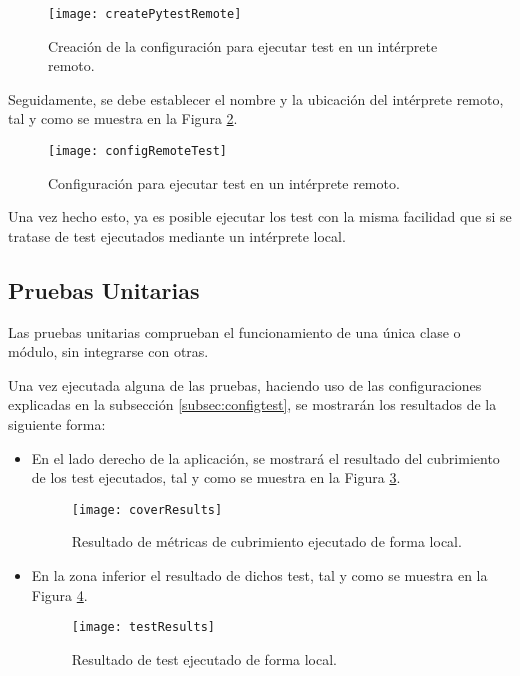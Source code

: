 \begin{figure}[H]
	\centering
	\texttt{[image: createPytestRemote]}
	\caption[Creación de configuración de test de ejecución remota]{Creación de la configuración para ejecutar test en un intérprete remoto.}\label{fig:createPytestRemote}
\end{figure}

Seguidamente, se debe establecer el nombre y la ubicación del intérprete remoto, tal y como se muestra en la Figura \ref{fig:configRemoteTest}.

\begin{figure}[H]
	\centering
	\texttt{[image: configRemoteTest]}
	\caption[Configuración de test de ejecución remota]{Configuración para ejecutar test en un intérprete remoto.}\label{fig:configRemoteTest}
\end{figure}

Una vez hecho esto, ya es posible ejecutar los test con la misma facilidad que si se tratase de test ejecutados mediante un intérprete local.


\subsection{Pruebas Unitarias}
Las pruebas unitarias comprueban el funcionamiento de una única clase o módulo, sin integrarse con otras. 

Una vez ejecutada alguna de las pruebas, haciendo uso de las configuraciones explicadas en la subsección \ref{subsec:configtest}, se mostrarán los resultados de la siguiente forma:

\begin{itemize}
\item En el lado derecho de la aplicación, se mostrará el resultado del cubrimiento de los test ejecutados, tal y como se muestra en la Figura \ref{fig:coverResults}. 
\begin{figure}[H]
	\centering
	\texttt{[image: coverResults]}
	\caption[Resultado de cubrimiento de test en intérprete local]{Resultado de métricas de cubrimiento ejecutado de forma local.}\label{fig:coverResults}
\end{figure}

\item En la zona inferior el resultado de dichos test, tal y como se muestra en la Figura \ref{fig:testResults}.

\begin{figure}[H]
	\centering
	\texttt{[image: testResults]}
	\caption[Resultado de test en intérprete local]{Resultado de test ejecutado de forma local.}\label{fig:testResults}
\end{figure}
\end{itemize}

